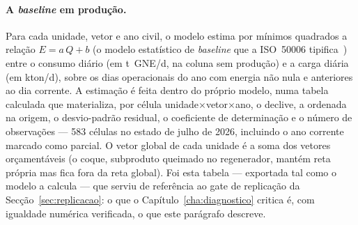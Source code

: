 \paragraph{A \emph{baseline} em produção.} Para cada unidade, vetor e ano
civil, o modelo estima por mínimos quadrados a relação
$E = a\,Q + b$ (o modelo estatístico de \emph{baseline} que a ISO~50006
tipifica~\cite{ISO50006_2014}) entre o consumo diário (em t~GNE/d, na coluna sem
produção) e a carga diária (em kton/d), sobre os dias operacionais do ano
com energia não nula e anteriores ao dia corrente. A estimação é feita
dentro do próprio modelo, numa tabela calculada que materializa, por
célula unidade$\times$vetor$\times$ano, o declive, a ordenada na origem,
o desvio-padrão residual, o coeficiente de determinação e o número de
observações --- 583 células no estado de julho de 2026, incluindo o ano
corrente marcado como parcial. O vetor global de cada unidade é a soma
dos vetores orçamentáveis (o coque, subproduto queimado no regenerador,
mantém reta própria mas fica fora da reta global). Foi esta tabela ---
exportada tal como o modelo a calcula --- que serviu de referência ao gate
de replicação da Secção~\ref{sec:replicacao}: o que o
Capítulo~\ref{cha:diagnostico} critica é, com igualdade numérica
verificada, o que este parágrafo descreve.

